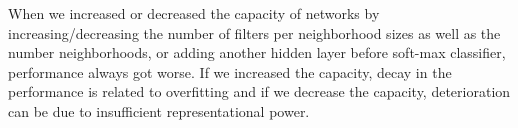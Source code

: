 When we increased or decreased the capacity of networks by increasing/decreasing the number of filters per neighborhood sizes as well as the number neighborhoods, or adding another hidden layer before soft-max classifier, performance always got worse.
If we increased the capacity, decay in the performance is related to overfitting and if we decrease the capacity, deterioration can be due to insufficient representational power.
